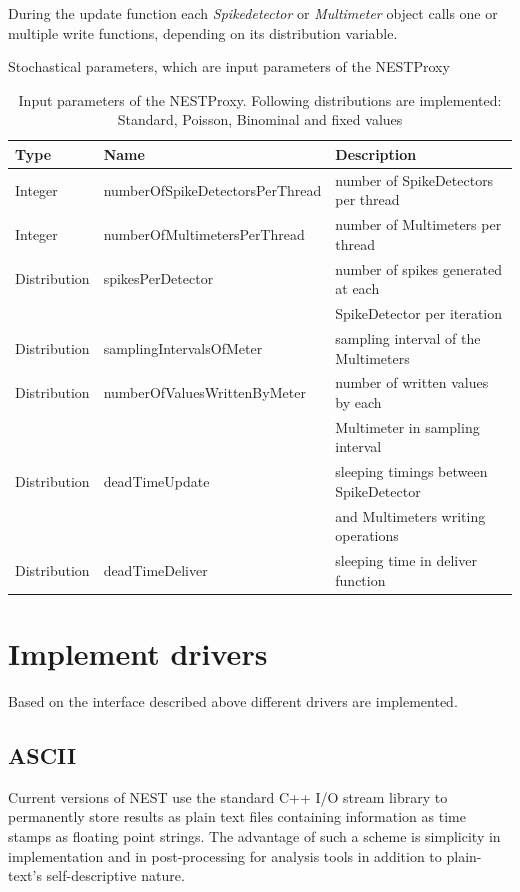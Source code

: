 \documentclass[]{YIC2015}
\begin{document}
During the update function each \emph{Spikedetector} or
\emph{Multimeter} object calls one or multiple write functions,
depending on its distribution variable.

\begin{table}[htdp]
\caption{Stochastical parameters, which are input parameters of the NESTProxy}
\centering
\begin{tabular}{lll}
\hline\hline
\textbf{Type} & \textbf{Name}                   & \textbf{Description} \\ \hline
Integer       & numberOfSpikeDetectorsPerThread & number of SpikeDetectors per thread  \\
Integer       & numberOfMultimetersPerThread    & number of Multimeters per thread  \\
Distribution  & spikesPerDetector               & number of spikes generated at each \\
	      &					& SpikeDetector per iteration  \\
Distribution  & samplingIntervalsOfMeter        & sampling interval of the Multimeters  \\
Distribution  & numberOfValuesWrittenByMeter    & number of written values by each \\
	      &					& Multimeter in sampling interval  \\
Distribution  & deadTimeUpdate                  & sleeping timings between SpikeDetector \\
	      &					& and Multimeters writing operations \\
Distribution  & deadTimeDeliver                 & sleeping time in deliver function  \\
\hline\hline
\end{tabular}
\label{tab:table-silva1}
\caption{Input parameters of the NESTProxy. Following distributions
are implemented: Standard, Poisson, Binominal and fixed values}
\end{table}

\section{Implement drivers}
Based on the interface described above different drivers are
implemented.

\subsection{ASCII}
\label{sec:ascii}
Current versions of NEST use the standard C++ I/O stream library
to permanently store results as plain text files
containing information as time stamps as floating point strings. The
advantage of such a scheme is simplicity in implementation and in
post-processing for analysis tools in addition to plain-text's
self-descriptive nature.
\end{document}
